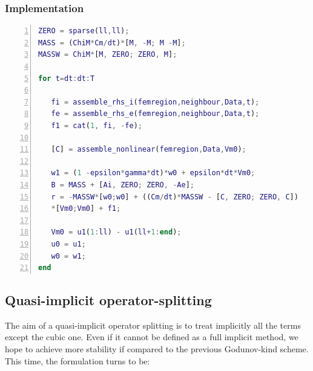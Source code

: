 \documentclass[a4paper,11pt]{article}
\begin{document}
\subsubsection{Implementation}
\begin{lstlisting}[language=Matlab,basicstyle=\small, numbers=left, numberstyle=\tiny,  name = main2D.m (Godunov operator-splitting), frame=single]
ZERO = sparse(ll,ll);
MASS = (ChiM*Cm/dt)*[M, -M; M -M];
MASSW = ChiM*[M, ZERO; ZERO, M];

for t=dt:dt:T

   fi = assemble_rhs_i(femregion,neighbour,Data,t);
   fe = assemble_rhs_e(femregion,neighbour,Data,t);
   f1 = cat(1, fi, -fe);

   [C] = assemble_nonlinear(femregion,Data,Vm0);

   w1 = (1 -epsilon*gamma*dt)*w0 + epsilon*dt*Vm0;
   B = MASS + [Ai, ZERO; ZERO, -Ae];
   r = -MASSW*[w0;w0] + ((Cm/dt)*MASSW - [C, ZERO; ZERO, C])
   *[Vm0;Vm0] + f1;

   Vm0 = u1(1:ll) - u1(ll+1:end);
   u0 = u1;
   w0 = w1;
end
\end{lstlisting}
\vspace{4mm}
\subsection{Quasi-implicit operator-splitting}
The aim of a quasi-implicit operator splitting is to treat implicitly all the terms except the cubic one. Even if it cannot be defined as a full implicit method, we hope to achieve more stability if compared to the previous Godunov-kind scheme. This time, the formulation turns to be: \newline
\end{document}
